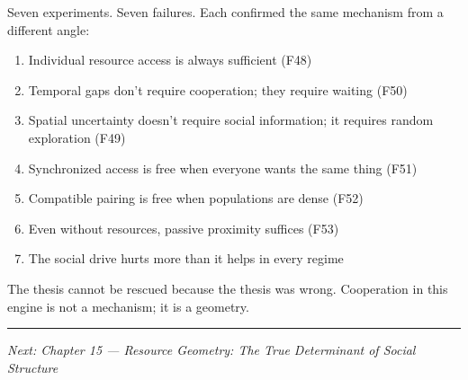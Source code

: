 Seven experiments. Seven failures. Each confirmed the same mechanism from a different angle:

\begin{enumerate}
\def\labelenumi{\arabic{enumi}.}
\tightlist
\item
  Individual resource access is always sufficient (F48)
\item
  Temporal gaps don't require cooperation; they require waiting (F50)
\item
  Spatial uncertainty doesn't require social information; it requires random exploration (F49)
\item
  Synchronized access is free when everyone wants the same thing (F51)
\item
  Compatible pairing is free when populations are dense (F52)
\item
  Even without resources, passive proximity suffices (F53)
\item
  The social drive hurts more than it helps in every regime
\end{enumerate}

The thesis cannot be rescued because the thesis was wrong. Cooperation in this engine is not a mechanism; it is a geometry.

\begin{center}\rule{0.5\linewidth}{0.5pt}\end{center}

\emph{Next: Chapter 15 --- Resource Geometry: The True Determinant of Social Structure}
